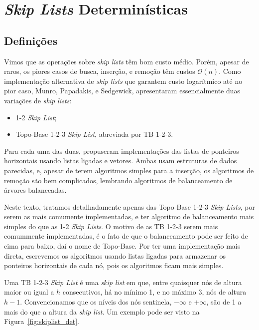 \documentclass[paper=a4, fontsize=11pt]{scrartcl} %
\numberwithin{equation}{section}
\numberwithin{figure}{section}
\numberwithin{table}{section}
\numberwithin{definition}{section}
\numberwithin{theorem}{section}
\numberwithin{property}{section}
\numberwithin{proposition}{section}
\newcommand{\cO}{\ensuremath{\mathcal{O}}}
\newcommand{\SL}{\textit{Skip List}\xspace}
\newcommand{\SLs}{\textit{Skip Lists}\xspace}
\newcommand{\sls}{\textit{skip lists}\xspace}
\renewcommand{\sl}{\textit{skip list}\xspace}
\begin{document}
\section{\SLs Determinísticas}
\subsection{Definições}

Vimos que as operações sobre \sls têm bom custo médio. Porém, apesar de raros, os piores casos de busca,
inserção, e remoção têm custos $\cO(n)$. Como implementação alternativa de \sls que garantem
custo logarítmico até no pior caso, Munro, Papadakis, e Sedgewick, apresentaram essencialmente duas variações 
de \sls \cite{munro1992deterministic}:
\begin{itemize}
  \item 1-2 \SL;
  \item Topo-Base 1-2-3 \SL, abreviada por TB 1-2-3.
\end{itemize}

Para cada uma das duas, propuseram implementações das listas de ponteiros horizontais usando listas
ligadas e vetores. Ambas 
usam estruturas de dados parecidas, e, apesar de terem algoritmos simples para a inserção, os 
algoritmos de remoção são bem complicados, lembrando algoritmos de balanceamento de árvores balanceadas.


Neste texto, tratamos detalhadamente apenas das Topo Base 1-2-3 \SLs, por serem as mais comumente
implementadas, e ter algoritmo de balanceamento mais simples do que as 1-2 \SLs.
O motivo de as TB 1-2-3 serem mais comummente implementadas, é o fato de que
o balanceamento pode ser feito de cima para baixo, daí o nome de Topo-Base. Por ter uma implementação
mais direta, escrevemos os algoritmos usando listas ligadas para armazenar os ponteiros horizontais 
de cada nó,  pois os algoritmos ficam mais simples.

Uma TB 1-2-3 \SL é uma \sl em que, entre quaisquer nós de altura maior ou igual a $h$ consecutivos, 
há no mínimo 1, e no máximo 3, nós de altura $h - 1$. Convencionamos que os níveis dos nós 
sentinela, $-\infty$ e $+\infty$,
são de 1 a mais do que a altura da \sl. Um exemplo pode ser visto na Figura~\ref{fig:skiplist_det}.
\end{document}

